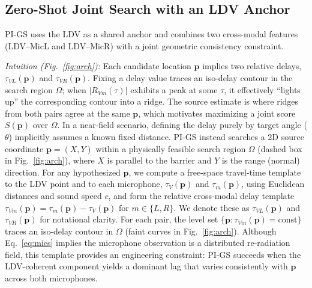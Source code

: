 \documentclass{Interspeech}
\begin{document}
\subsection{Zero-Shot Joint Search with an LDV Anchor}
\label{sec:joint_search}

PI-GS uses the LDV as a shared anchor and combines two cross-modal features (LDV--MicL and LDV--MicR) with a joint geometric consistency constraint.

\textit{Intuition (Fig.~\ref{fig:arch}):} Each candidate location $\mathbf{p}$ implies two relative delays, $\tau_{VL}(\mathbf{p})$ and $\tau_{VR}(\mathbf{p})$. Fixing a delay value traces an iso-delay contour in the search region $\Omega$; when $|R_{Vm}(\tau)|$ exhibits a peak at some $\tau$, it effectively ``lights up'' the corresponding contour into a ridge. The source estimate is where ridges from both pairs agree at the same $\mathbf{p}$, which motivates maximizing a joint score $S(\mathbf{p})$ over $\Omega$. In a near-field scenario, defining the delay purely by target angle ($\theta$) implicitly assumes a known fixed distance. PI-GS instead searches a 2D source coordinate $\mathbf{p} = (X, Y)$ within a physically feasible search region $\Omega$ (dashed box in Fig.~\ref{fig:arch}), where $X$ is parallel to the barrier and $Y$ is the range (normal) direction. For any hypothesized $\mathbf{p}$, we compute a free-space travel-time template to the LDV point and to each microphone, $\tau_V(\mathbf{p})$ and $\tau_m(\mathbf{p})$, using Euclidean distances and sound speed $c$, and form the relative cross-modal delay template $\tau_{Vm}(\mathbf{p}) = \tau_m(\mathbf{p}) - \tau_V(\mathbf{p})$ for $m \in \{L, R\}$. We denote these as $\tau_{VL}(\mathbf{p})$ and $\tau_{VR}(\mathbf{p})$ for notational clarity. For each pair, the level set $\{\mathbf{p}:\tau_{Vm}(\mathbf{p})=\text{const}\}$ traces an iso-delay contour in $\Omega$ (faint curves in Fig.~\ref{fig:arch}). Although Eq.~\ref{eq:mics} implies the microphone observation is a distributed re-radiation field, this template provides an engineering constraint: PI-GS succeeds when the LDV-coherent component yields a dominant lag that varies consistently with $\mathbf{p}$ across both microphones.
\end{document}
